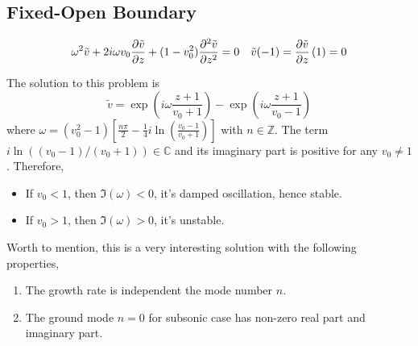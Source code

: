 \subsection{Fixed-Open Boundary}

\begin{equation} \label{eq:constant-v-problem-fixed-open}
	\omega^2\tilde{v} + 2i\omega v_0\pdv{\tilde{v}}{z} + (1-v_0^2)\pdv[2]{\tilde{v}}{z} = 0
	\quad
	\tilde{v}(-1) = \pdv{\tilde{v}}{z}\,(1) = 0
\end{equation}

The solution to this problem is
\begin{equation} \label{eq:constant-v-solution-fixed-open}
	\tilde{v} = \exp\left(i\omega\frac{z+1}{v_0+1}\right)
	- \exp\left(i\omega\frac{z+1}{v_0-1}\right)
\end{equation}
where $\omega = (v_0^2 - 1) \left[\frac{n\pi}{2} - \frac{1}{4}i\ln(\frac{v_0-1}{v_0+1})\right]$ with $n\in\mathbb{Z}$. The term $i\ln((v_0-1)/(v_0+1))\in\mathbb{C}$ and its imaginary part is positive for any $v_0\neq 1$. Therefore,
\begin{itemize}
	\item If $v_0<1$, then $\Im(\omega)<0$, it's damped oscillation, hence stable.
	\item If $v_0>1$, then $\Im(\omega)>0$, it's unstable.
\end{itemize}

Worth to mention, this is a very interesting solution with the following properties,
\begin{enumerate}
	\item The growth rate is independent the mode number $n$.
	\item The ground mode $n=0$ for subsonic case has non-zero real part and imaginary part.
\end{enumerate}

